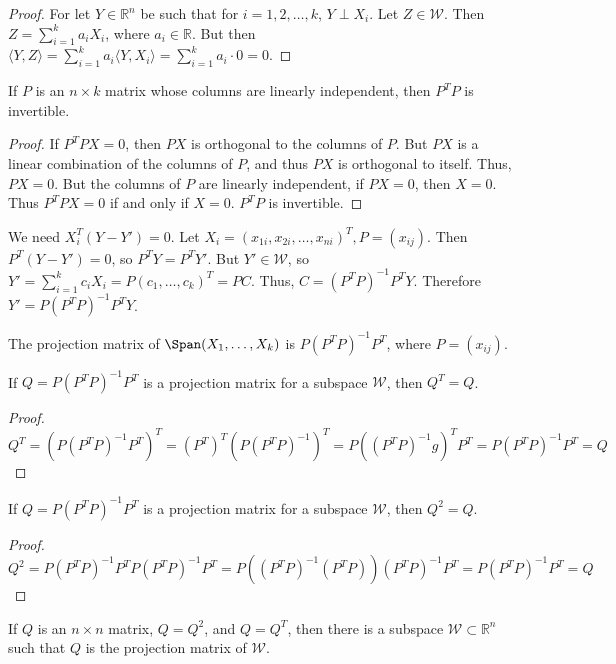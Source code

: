 \documentclass[crop=false,class=book]{standalone}
\begin{document}
\begin{proof}
For let $Y\in \mathbb{R}^n$ be such that for $i=1,2,\hdots, k$, $Y\perp X_i$. Let $Z\in \mathcal{W}$. Then $Z= \sum_{i=1}^{k} a_i X_i$, where $a_i\in \mathbb{R}$. But then $\langle Y, Z\rangle = \sum_{i=1}^{k} a_i \langle Y, X_i\rangle = \sum_{i=1}^{k} a_i\cdot 0 = 0$. 
\end{proof}
\begin{lemma}
If $P$ is an $n\times k$ matrix whose columns are linearly independent, then $P^TP$ is invertible.
\end{lemma}
\begin{proof}
If $P^TPX = 0$, then $PX$ is orthogonal to the columns of $P$. But $PX$ is a linear combination of the columns of $P$, and thus $PX$ is orthogonal to itself. Thus, $PX = 0$. But the columns of $P$ are linearly independent, if $PX = 0$, then $X=0$. Thus $P^TPX = 0$ if and only if $X=0$. $P^TP$ is invertible.
\end{proof}
We need $X_{i}^T(Y-Y')=0$. Let $X_{i}=(x_{1i},x_{2i},\hdots,x_{ni})^{T},P=(x_{ij})$. Then $P^T(Y-Y') = 0$, so $P^TY = P^T Y'$. But $Y'\in \mathcal{W}$, so $Y' = \sum_{i=1}^{k} c_i X_i = P(c_1,\hdots, c_k)^T = PC$. Thus, $C = (P^TP)^{-1}P^TY$. Therefore $Y'=P(P^TP)^{-1}P^T Y$.
\begin{definition}
The projection matrix of $\Span(X_{1},\hdots,X_{k})$ is $P(P^TP)^{-1}P^T$, where $P=(x_{ij})$.
\end{definition}
\begin{theorem}
If $Q = P(P^TP)^{-1}P^T$ is a projection matrix for a subspace $\mathcal{W}$, then $Q^T =Q$.
\end{theorem}
\begin{proof}
$Q^T=(P(P^{T}P)^{-1}P^{T})^{T}=(P^{T})^{T}(P(P^{T}P)^{-1})^{T}= P((P^{T}P)^{-1}g)^{T}P^{T}=P(P^{T}P)^{-1}P^{T}=Q$
\end{proof}
\begin{theorem}
If $Q = P(P^TP)^{-1}P^T$ is a projection matrix for a subspace $\mathcal{W}$, then $Q^2 = Q$.
\end{theorem}
\begin{proof}
$Q^{2}=P(P^TP)^{-1}P^TP(P^TP)^{-1}P^T= P((P^{T}P)^{-1}(P^{T}P))(P^{T}P)^{-1}P^{T}=P(P^{T}P)^{-1}P^{T}=Q$
\end{proof}
\begin{theorem}
If $Q$ is an $n\times n$ matrix, $Q = Q^{2}$, and $Q=Q^{T}$, then there is a subspace $\mathcal{W}\subset \mathbb{R}^{n}$ such that $Q$ is the projection matrix of $\mathcal{W}$.
\end{theorem}
\end{document}
